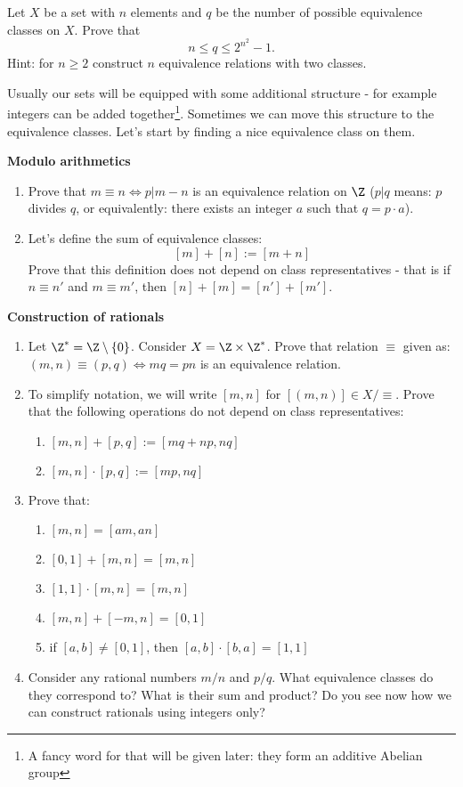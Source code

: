 \begin{exercise}
  Let $X$ be a set with $n$ elements and $q$ be the number of possible equivalence classes on $X$. Prove that $$n\le q \le 2^{n^2}-1.$$ Hint: for $n\ge 2$ construct $n$ equivalence relations with two classes.
\end{exercise}

Usually our sets will be equipped with some additional structure - for example integers can be added together\footnote{A fancy word for that will be given later: they form an additive Abelian group}. Sometimes we can move this structure to the equivalence classes. Let's start by finding a nice equivalence class on them.

\begin{exercise}
  \textbf{Modulo arithmetics}
  \begin{enumerate}
    \item Prove that $m\equiv n\Leftrightarrow p|m-n$ is an equivalence relation on $\Z$ ($p|q$ means: $p$ divides $q$, or equivalently: there exists an integer $a$ such that $q=p\cdot a$).
    \item Let's define the sum of equivalence classes:
      $$[m]+[n] := [m+n]$$
      Prove that this definition does not depend on class representatives - that is if $n\equiv n'$ and $m\equiv m'$, then $[n]+[m]=[n']+[m']$.
  \end{enumerate}
\end{exercise}

\begin{exercise}
  \textbf{Construction of rationals}
  \begin{enumerate}
    \item Let $\Z^*=\Z\setminus\{0\}$. Consider $X=\Z\times \Z^*$. Prove that relation $\equiv$ given as: $(m,n)\equiv (p,q)\Leftrightarrow mq=pn$ is an equivalence relation.
    \item To simplify notation, we will write $[m,n]$ for $[(m,n)]\in X/\equiv$. Prove that the following operations do not depend on class representatives:
      \begin{enumerate}
        \item $[m,n] + [p,q] := [mq+np, nq]$
        \item $[m,n]\cdot [p,q] := [mp, nq]$
      \end{enumerate}
    \item Prove that:
      \begin{enumerate}
        \item $[m,n]=[am,an]$
        \item $[0,1]+[m,n]=[m,n]$
        \item $[1,1]\cdot [m,n]=[m,n]$
        \item $[m,n] + [-m,n]=[0,1]$
        \item if $[a,b]\neq [0,1]$, then $[a,b]\cdot [b,a]=[1,1]$
      \end{enumerate}
    \item Consider any rational numbers $m/n$ and $p/q$. What equivalence classes do they correspond to? What is their sum and product? Do you see now how we can construct rationals using integers only?
  \end{enumerate}
\end{exercise}

